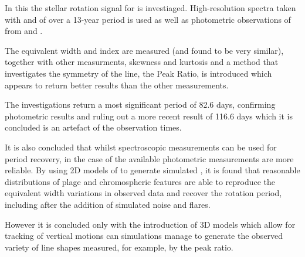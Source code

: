 In this {\paperorthesis} the stellar rotation signal for {\prox} is investiaged. High-resolution spectra taken with
{\uves} and {\harps} of {\prox} over a 13-year period is used as well as photometric observations of {\prox} from
{\asas} and {\hst}.

The {\ha} equivalent width and {\ha} index are measured (and found to be very similar), together with other measurments,
  skewness and kurtosis and a method that investigates the symmetry of the line, the Peak Ratio, is introduced which
  appears to return better results than the other measurements.

The investigations return a most significant period of 82.6 days, confirming photometric results and ruling out a more
  recent result of 116.6 days which it is concluded is an artefact of the observation times.

It is also concluded that whilst spectroscopic {\ha} measurements can be used for period recovery, in the case of
  {\prox} the available photometric measurements are more reliable. By using 2D models of {\prox} to generate simulated
  {\ha}, it is found that reasonable distributions of plage and chromospheric features are able to reproduce the
  equivalent width variations in observed data and recover the rotation period, including after the addition of
  simulated noise and flares.

However it is concluded only with the introduction of 3D models which allow for tracking of vertical motions can
simulations manage to generate the observed variety of line shapes measured, for example, by the peak ratio.
